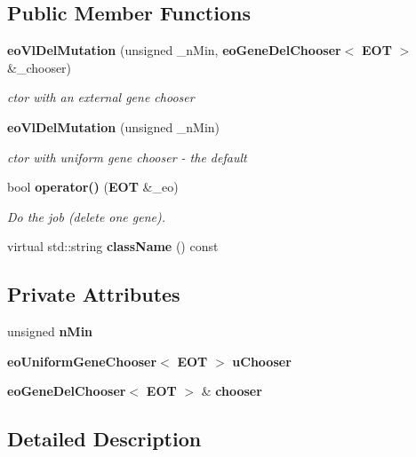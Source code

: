 \subsection*{Public Member Functions}
\begin{CompactItemize}
\item 
{\bf eo\-Vl\-Del\-Mutation} (unsigned \_\-n\-Min, {\bf eo\-Gene\-Del\-Chooser}$<$ {\bf EOT} $>$ \&\_\-chooser)
\begin{CompactList}\small\item\em ctor with an external gene chooser \item\end{CompactList}\item 
{\bf eo\-Vl\-Del\-Mutation} (unsigned \_\-n\-Min)
\begin{CompactList}\small\item\em ctor with uniform gene chooser - the default \item\end{CompactList}\item 
bool {\bf operator()} ({\bf EOT} \&\_\-eo)
\begin{CompactList}\small\item\em Do the job (delete one gene). \item\end{CompactList}\item 
virtual std::string {\bf class\-Name} () const \label{classeo_vl_del_mutation_a3}

\end{CompactItemize}
\subsection*{Private Attributes}
\begin{CompactItemize}
\item 
unsigned {\bf n\-Min}\label{classeo_vl_del_mutation_r0}

\item 
{\bf eo\-Uniform\-Gene\-Chooser}$<$ {\bf EOT} $>$ {\bf u\-Chooser}\label{classeo_vl_del_mutation_r1}

\item 
{\bf eo\-Gene\-Del\-Chooser}$<$ {\bf EOT} $>$ \& {\bf chooser}\label{classeo_vl_del_mutation_r2}

\end{CompactItemize}


\subsection{Detailed Description}
